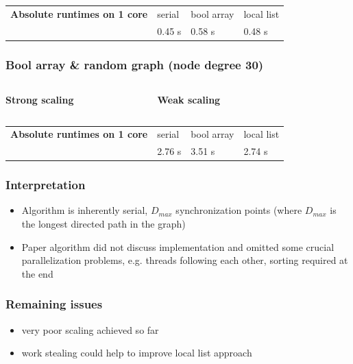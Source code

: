 \begin{frame}
\begin{table}
\tiny
\begin{tabular}{lp{1cm}|p{1cm}|p{1cm}}
 {\bfseries Absolute runtimes on 1 core}  & serial  & bool array  & local list\\
                                          & 0.45 s  & 0.58 s      & 0.48 s
\end{tabular}
\end{table}

\end{frame}

\begin{frame}
\frametitle{Bool array & random graph (node degree 30)}
\begin{columns}[T]
  \bfseries{Strong scaling}
  \begin{figure}[!ht]
    \begin{center}
    \end{center}
  \end{figure}

  \bfseries{Weak scaling}
  \begin{figure}[!ht]
    \begin{center}
    \end{center}
  \end{figure}
\end{columns}

\begin{table}
\tiny
\begin{tabular}{lp{1cm}|p{1cm}|p{1cm}}
 {\bfseries Absolute runtimes on 1 core}  & serial  & bool array  & local list\\
                                          & 2.76 s  & 3.51 s      & 2.74 s
\end{tabular}
\end{table}

\end{frame}


\begin{frame}
 \frametitle{Interpretation}
 \begin{itemize}
	 \item Algorithm is inherently serial, $D_{max}$ synchronization points (where $D_{max}$ is the longest directed path in the graph)
	 \item Paper algorithm did not discuss implementation and omitted some crucial parallelization problems, e.g. threads following each other, sorting required at the end
 \end{itemize}
\end{frame}



\begin{frame}
 \frametitle{Remaining issues}
 \begin{itemize}
	 \item very poor scaling achieved so far
	 \item work stealing could help to improve local list approach
 \end{itemize}
\end{frame}


 

